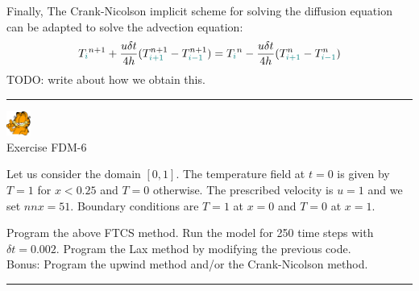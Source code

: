 Finally, The Crank-Nicolson implicit scheme for solving the diffusion equation 
can be adapted to solve the advection equation:
\[
T_{\color{teal}i}^{n+1} + \frac{u \delta t}{4h} (T_{{\color{teal}i+1}}^{n+1}-T_{{\color{teal}i-1}}^{n+1}) 
= T_{\color{teal}i}^n - \frac{u \delta t}{4h} (T_{{\color{teal}i+1}}^{n}-T_{{\color{teal}i-1}}^{n}) 
\]
TODO: write about how we obtain this.


\begin{center}
\begin{minipage}[t]{0.77\textwidth}
\par\noindent\rule{\textwidth}{0.4pt}

\begin{center}
\includegraphics[width=0.8cm]{images/garftr} \\
{\color{orange}Exercise FDM-6}
\end{center}

Let us consider the domain $[0,1]$. The temperature field at $t=0$ is 
given by $T=1$ for $x<0.25$ and $T=0$ otherwise. The prescribed 
velocity is $u=1$ and we set $nnx=51$.
Boundary conditions are $T=1$ at $x=0$ and $T=0$ at $x=1$.

\begin{center}

\end{center}

Program the above FTCS method. Run the model for 250 time steps with $\delta t=0.002$. 
Program the Lax method by modifying the previous code.\\
Bonus: Program the upwind method and/or the Crank-Nicolson method. 

\par\noindent\rule{\textwidth}{0.4pt}
\end{minipage}
\end{center}



